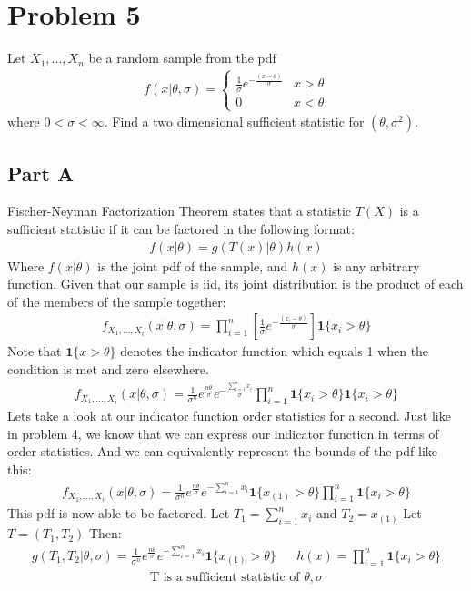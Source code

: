 \documentclass{article}
\begin{document}
\clearpage

\section*{Problem 5}
Let $X_1,...,X_n$ be a random sample from the pdf
\begin{align*}
f(x|\theta,\sigma) = \begin{cases} 
      \frac{1}{\sigma} e^{-\frac{(x-\theta)}{\sigma}} & x > \theta \\
       0 & x < \theta 
   \end{cases}
\end{align*}
where $0<\sigma<\infty$. Find a two dimensional sufficient statistic for $(\theta,\sigma^2)$.
\subsection*{Part A}
Fischer-Neyman Factorization Theorem states that a statistic $T(X)$ is a sufficient statistic if it can be factored in the following format:
\begin{align*}
f(x|\theta) = g(T(x)|\theta)h(x)
\end{align*}
Where $f(x|\theta)$ is the joint pdf of the sample, and $h(x)$ is any arbitrary function. Given that our sample is iid, its joint distribution is the product of each of the members of the sample together:
\begin{align*}
f_{X_1,...,X_i}(x|\theta,\sigma) = \prod_{i=1}^{n} [\frac{1}{\sigma} e^{-\frac{(x_i-\theta)}{\sigma}}] \mathbf{1}\{x_i > \theta\}
\end{align*}
Note that $\mathbf{1}\{x > \theta\}$ denotes the indicator function which equals 1 when the condition is met and zero elsewhere.
\begin{align*}
f_{X_1,...,X_i}(x|\theta,\sigma) = \frac{1}{\sigma^n} e^{\frac{n\theta}{\sigma}} e^{-\frac{\sum_{i=1}^{n} x_i}{\sigma}} \prod_{i=1}^{n} \mathbf{1}\{x_i > \theta\} \mathbf{1}\{x_i > \theta\}
\end{align*}
Lets take a look at our indicator function order statistics for a second. Just like in problem 4, we know that we can express our indicator function in terms of order statistics. And we can equivalently represent the bounds of the pdf like this:
\begin{align*}
f_{X_1,...,X_i}(x|\theta,\sigma) = \frac{1}{\sigma^n} e^{\frac{n\theta}{\sigma}} e^{-\sum_{i=1}^{n} x_i} \mathbf{1}\{x_{(1)} > \theta\} \prod_{i=1}^{n} \mathbf{1}\{x_i > \theta\}
\end{align*}
This pdf is now able to be factored. Let $T_1 = \sum_{i=1}^{n} x_i$ and $T_2 = x_{(1)}$ Let $T = (T_1,T_2)$ Then:
\begin{align*}
g(T_1,T_2|\theta,\sigma) = \frac{1}{\sigma^n} e^{\frac{n\theta}{\sigma}} e^{-\sum_{i=1}^{n} x_i} \mathbf{1}\{x_{(1)} > \theta\} && h(x)=\prod_{i=1}^{n} \mathbf{1}\{x_i > \theta\}
\end{align*}
\begin{align*}
\boxed{ \text{T is a sufficient statistic of } \theta,\sigma }
\end{align*}
\end{document}
